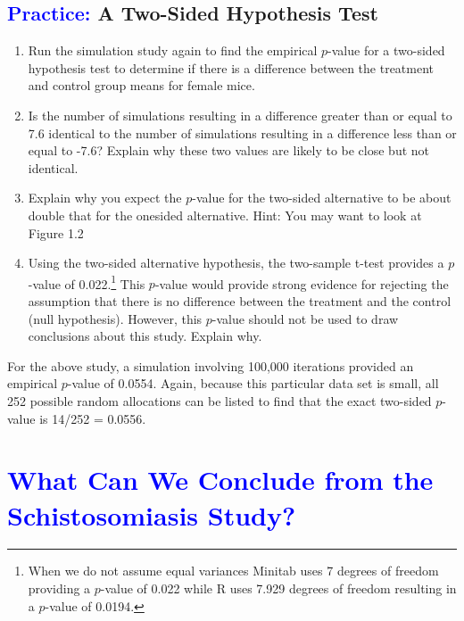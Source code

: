 \documentclass[
]{report}
\begin{document}
\hypertarget{a-two-sided-hypothesis-test}{%
\subsection*{\texorpdfstring{\textcolor{blue}{Practice:} A Two-Sided Hypothesis Test}{ A Two-Sided Hypothesis Test}}\label{a-two-sided-hypothesis-test}}

\begin{enumerate}
\def\labelenumi{\arabic{enumi}.}
\setcounter{enumi}{12}
\item
  Run the simulation study again to find the empirical \(\scriptstyle p\)-value for a two-sided hypothesis test to determine if there is a difference between the treatment and control group means for female mice.
\item
  Is the number of simulations resulting in a difference greater than or equal to 7.6 identical to the number of simulations resulting in a difference less than or equal to -7.6? Explain why these two values are likely to be close but not identical.
\item
  Explain why you expect the \(\scriptstyle p\)-value for the two-sided alternative to be about double that for the onesided alternative. Hint: You may want to look at Figure 1.2
\item
  Using the two-sided alternative hypothesis, the two-sample t-test provides a \(\scriptstyle p\)-value of 0.022.\footnote{When we do not assume equal variances Minitab uses 7 degrees of freedom providing a \(\scriptstyle p\)-value of 0.022 while R uses 7.929 degrees of freedom resulting in a \(\scriptstyle p\)-value of 0.0194.} This \(\scriptstyle p\)-value would provide strong evidence for rejecting the assumption that there is no difference between the treatment and the control (null hypothesis). However, this \(\scriptstyle p\)-value should not be used to draw conclusions about this study. Explain why.
\end{enumerate}

For the above study, a simulation involving 100,000 iterations provided an empirical \(\scriptstyle p\)-value of 0.0554. Again, because this particular data set is small, all 252 possible random allocations can be listed to find that the exact two-sided \(\scriptstyle p\)-value is 14/252 = 0.0556.

\hypertarget{section-4}{%
\section{\texorpdfstring{\textcolor{blue}{What Can We Conclude from the Schistosomiasis Study?}}{}}\label{section-4}}
\end{document}
